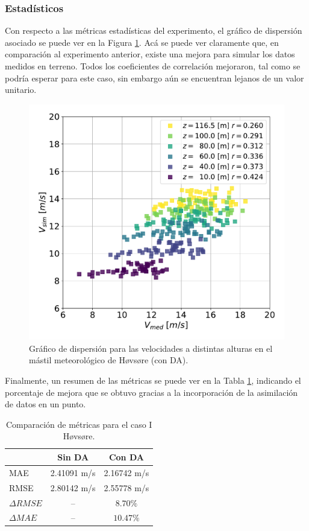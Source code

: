 \subsubsection{Estadísticos}
Con respecto a las métricas estadísticas del experimento, el gráfico de dispersión asociado se puede ver en la Figura \ref{fig:06_corr_hov_da}. Acá se puede ver claramente que, en comparación al experimento anterior, existe una mejora para simular los datos medidos en terreno. Todos los coeficientes de correlación mejoraron, tal como se podría esperar para este caso, sin embargo aún se encuentran lejanos de un valor unitario.
\begin{figure}[H]
	\centering
	\includegraphics[width=0.55\linewidth,page=1,trim={0cm 0cm 0cm 0cm},clip]{Imagenes/06/hov_da/corr}%
	\caption{Gráfico de dispersión para las velocidades a distintas alturas en el mástil meteorológico de Høvsøre (con DA).}
	\label{fig:06_corr_hov_da}
\end{figure}

Finalmente, un resumen de las métricas se puede ver en la Tabla \ref{tab:06_hov_mae_rmse}, indicando el porcentaje de mejora que se obtuvo gracias a la incorporación de la asimilación de datos en un punto.

\begin{table}[H]
	\caption{Comparación de métricas para el caso I Høvsøre.}
	\label{tab:06_hov_mae_rmse}
	\centering%
	\begin{tabular}{lcc}
		\toprule
		& Sin DA & Con DA \\
		\midrule
		MAE & 2.41091 m/s & 2.16742 m/s \\
		RMSE & 2.80142 m/s& 2.55778 m/s\\
		$\Delta{RMSE}$& --  & $8.70\%$  \\
		$\Delta{MAE}$ & -- & $10.47\%$  \\
		\bottomrule
	\end{tabular}
\end{table}

















